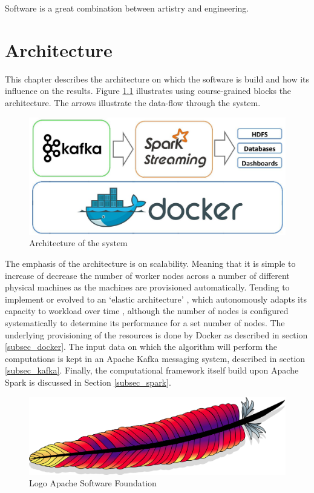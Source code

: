 \begin{savequote}[90mm] 
Software is a great combination between artistry and engineering.  
\end{savequote}

\chapter{Architecture \label{chap3:architecture}}

This chapter describes the architecture on which the software is build and how its influence on the results. Figure \ref{fig:architecture} illustrates using course-grained blocks the architecture. The arrows illustrate the data-flow through the system. 

\begin{figure}[ht!]
\centering
\includegraphics[width=\textwidth]{figures/architecture.jpg}
\caption{Architecture of the system}
\label{fig:architecture}
\end{figure}

The emphasis of the architecture is on scalability. Meaning that it is simple to increase of decrease the number of worker nodes across a number of different physical machines as the machines are provisioned automatically. Tending to implement or evolved to an `elastic architecture' \cite{9780470887998}, which autonomously adapts its capacity to workload over time \cite{180145}, although the number of nodes is configured systematically to determine its performance for a set number of nodes. The underlying provisioning of the resources is done by Docker as described in section \ref{subsec_docker}. The input data on which the algorithm will perform the computations is kept in an Apache Kafka messaging system, described in section \ref{subsec_kafka}. Finally, the computational framework itself build upon Apache Spark is discussed in Section \ref{subsec_spark}.

\begin{figure}[ht!]
\centering
\includegraphics[width=.6\textwidth]{figures/asf.png}
\caption{Logo Apache Software Foundation}
\label{fig:asf}
\end{figure}

